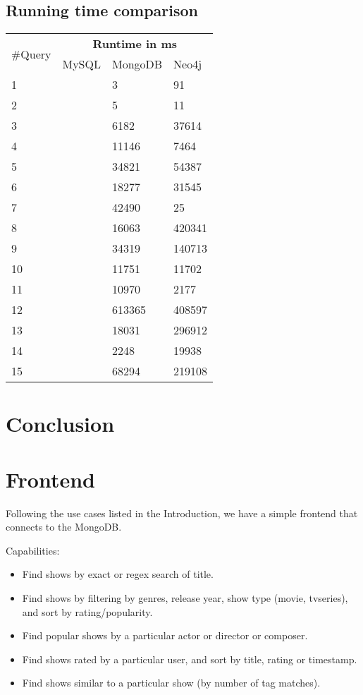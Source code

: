 \documentclass[10pt,titlepage]{article}
\begin{document}
\subsection{Running time comparison}

\begin{center}
\begin{tabular}{|l|l|l|l|}
\hline
\multirow{2}{*}{\#Query} & \multicolumn{3}{|c|}{\textbf{Runtime in ms}} \\ \cline{2-4}
& MySQL & MongoDB & Neo4j \\
\hline
1 &   & 3 & 91 \\
\hline
2 &   & 5  & 11 \\
\hline
3 &   & 6182  & 37614   \\
\hline
4 &   & 11146  & 7464   \\
\hline
5 &   & 34821  & 54387   \\
\hline
6 &   & 18277  & 31545   \\
\hline
7 &   & 42490  & 25 \\
\hline
8 &   & 16063  & 420341  \\
\hline
9 &   & 34319  & 140713   \\
\hline
10 &   & 11751  & 11702   \\
\hline
11 &   & 10970  & 2177 \\
\hline
12 &   & 613365  & 408597   \\
\hline
13 &   & 18031  & 296912 \\
\hline
14 &   & 2248  & 19938   \\
\hline
15 &   & 68294  & 219108  \\
\hline
\end{tabular}
\end{center}

\section{Conclusion}

\pagebreak
\section{Frontend}
Following the use cases listed in the Introduction, we have a simple frontend that connects to the MongoDB.

Capabilities:
\begin{itemize}
    \item Find shows by exact or regex search of title.
    \item Find shows by filtering by genres, release year, show type (movie, tvseries), and sort by rating/popularity.
    \item Find popular shows by a particular actor or director or composer.
    \item Find shows rated by a particular user, and sort by title, rating or timestamp.
    \item Find shows similar to a particular show (by number of tag matches).
\end{itemize}
\end{document}
